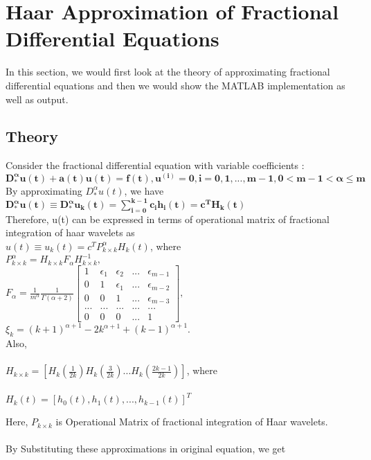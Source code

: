 \section{\textbf{Haar Approximation of Fractional Differential Equations}}

In this section, we would first look at the theory of approximating fractional differential equations and then we would show the MATLAB implementation as well as output.
\subsection{Theory}

Consider the fractional differential equation with variable coefficients : \\
$\mathbf{D_*^\alpha u(t)+a(t)u(t)=f(t),u^{(i)}=0, i=0,1,...,m-1, 0 < m-1 < \alpha \leq m}$ \\
By approximating $D_*^\alpha u(t)$, we have \\
$\mathbf{D_*^\alpha u(t) \equiv D_*^\alpha u_k(t) = \sum_{i=0}^{k-1} c_i h_i(t) = c^T H_k(t)}$ \\
Therefore, u(t) can be expressed in terms of operational matrix of fractional integration of haar wavelets as \\ $u(t) \equiv u_k(t)=c^T P_{k\times k}^\alpha H_k(t)$, where \\
$P_{k\times k}^\alpha = H_{k\times k}F_\alpha H_{k\times k}^{-1},$ \\ $F_\alpha = \frac{1}{m^\alpha}\frac{1}{\Gamma(\alpha+2)} \begin{bmatrix}
1&\epsilon_1&\epsilon_2&...&\epsilon_{m-1}\\ 
0&1&\epsilon_1&...&\epsilon_{m-2}\\ 
0&0&1&...&\epsilon_{m-3}\\ 
 ...&...&...&...&... \\ 
0&0&0&...&1  
\end{bmatrix} ,$ \\ $\xi_k = (k+1)^{\alpha+1} -2k^{\alpha+1} + (k-1)^{\alpha+1} $. \\ Also,\\~\\$H_{k \times k} = [H_k(\frac{1}{2k}) H_k(\frac{3}{2k}) ... H_k(\frac{2k-1}{2k})]$, where \\~\\ $ H_k(t) = [h_0(t),h_1(t),...,h_{k-1}(t)]^T$

Here, $P_{k \times k}$ is Operational Matrix of fractional integration of Haar wavelets.
\\~\\By Substituting these approximations in original equation, we get

